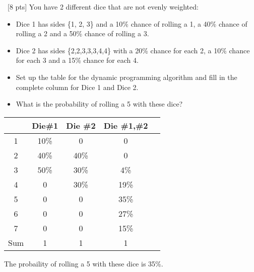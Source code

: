 \documentclass[12pt]{article}
\newenvironment{sol}[1][Solution]{\begin{trivlist}\item[\hskip\labelsep {\bfseries #1:}]}{\end{trivlist}}
\begin{document}
\begin{enumerate}
\begin{enumerate}
    \end{enumerate}

    \item \ [8 pts] You have 2 different dice that are not evenly weighted:
    \begin{itemize}
        \item Dice 1 has sides \{1, 2, 3\} and a 10\% chance of rolling a 1, a 40\% chance of rolling a 2 and a 50\% chance of rolling a 3.
        \item Dice 2 has sides \{2,2,3,3,3,4,4\} with a 20\% chance for each 2, a 10\% chance for each 3 and a 15\% chance for each 4.
        \item Set up the table for the dynamic programming algorithm and fill in the complete column for Dice 1 and Dice 2.
        \item What is the probability of rolling a 5 with these dice?
    \end{itemize}
        \begin{sol}
        \hspace*{\fill}
        \begin{center}
            \begin{tabular}{|c|c|c|c|c|}
            \hline
                 & Die\#1 & Die \#2 & Die \#1,\#2\\
                \hline
                1& 10\% & 0  & 0 \\
                \hline
                2& 40\% &40\%  & 0\\
                \hline
                3& 50\% &30\% & 4\%\\
                \hline
                4 & 0 & 30\%  &19\% \\
                \hline
                5& 0 &0  & 35\% \\
                \hline
                6 & 0 & 0 & 27\%\\
                \hline
                7 & 0 & 0 & 15\%\\
                \hline
                Sum& 1 &1 & 1  \\
                \hline
            \end{tabular}
        \end{center}
        The probaility of rolling a 5 with these dice is 35\%.
        \end{sol}


\end{enumerate}
\end{document}
